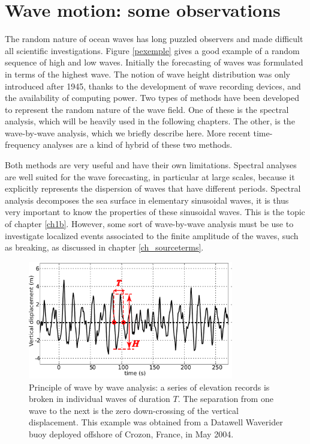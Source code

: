 \section{Wave motion: some observations}
The random nature of ocean waves has long puzzled observers and made difficult all scientific investigations. 
Figure \ref{pexemple} gives a good example of a random sequence of high and low waves. Initially  
the forecasting of waves was formulated in terms of the highest wave. The notion of wave height distribution was only introduced after 1945, 
thanks to the development of wave recording devices, and the availability of computing power. Two types of methods have been developed to 
represent the random nature of the wave field. 
One of these is the spectral analysis, which will be heavily used in the following chapters. The other, is the wave-by-wave analysis, 
which we briefly describe here. More recent time-frequency analyses are a kind of hybrid of these two methods. 


Both methods are very useful and have their own limitations. Spectral analyses are well suited for the wave forecasting, in 
particular at large scales, because it explicitly represents the dispersion of waves that have different periods. 
Spectral analysis decomposes the sea surface in elementary sinusoidal waves, it is thus very important to know the properties of these 
sinusoidal waves. This is the topic of chapter \ref{ch1b}.
However, some sort of wave-by-wave analysis must be use to investigate localized 
events associated to the finite amplitude of the waves, such as breaking, as discussed in chapter \ref{ch_sourceterms}. 

\begin{figure} \label{FigWaveriderTSz}
\centerline{\includegraphics[width=0.8\textwidth]{FIGS_CH_INTRO/Exemple_DWIROISE2004_en.pdf}}
  \caption{Principle of wave by wave analysis: a series of elevation records is broken in individual waves of duration $T$. The separation from one 
wave to the next is the zero down-crossing of the vertical displacement. This example was obtained from a Datawell Waverider buoy deployed offshore 
of Crozon, France, in May 2004.}\label{fig:zero_crossing}
\end{figure}


